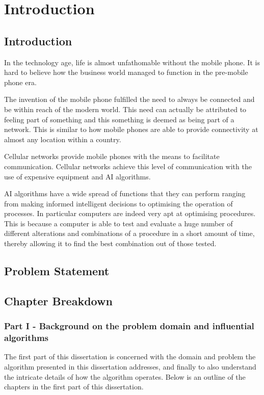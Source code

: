 \chapter{Introduction}
\section{Introduction}
In the technology age, life is almost unfathomable without the mobile phone. It is hard to believe how the business world managed to function in the pre-mobile phone era.

The invention of the mobile phone fulfilled the need to always be connected and be within reach of the modern world. This need can actually be attributed to feeling part of something and this something is deemed as being part of a network. This is similar to how mobile phones are able to provide connectivity at almost any location within a country.

Cellular networks provide mobile phones with the means to facilitate communication. Cellular networks achieve this level of communication with the use of expensive equipment and \gls{AI} algorithms.

\gls{AI} algorithms have a wide spread of functions that they can perform ranging from making informed intelligent decisions to optimising the operation of processes. In particular computers are indeed very apt at optimising procedures. This is because a computer is able to test and evaluate a huge number of different alterations and combinations of a procedure in a short amount of time, thereby allowing it to find the best combination out of those tested.

\section{Problem Statement}

\section {Chapter Breakdown}
\subsection{Part I - Background on the problem domain and influential algorithms}
The first part of this dissertation is concerned with the domain and problem the algorithm presented in this dissertation addresses, and finally to also understand the intricate details of how the algorithm operates.
Below is an outline of the chapters in the first part of this dissertation.
